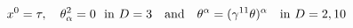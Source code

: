 \begin{equation}\label{5.2}
x^0=\tau,\quad \theta^2_\alpha=0~~{\rm in}~D=3\quad {\rm and}\quad
\theta^\alpha=(\gamma^{11}\theta)^\alpha ~~~{\rm in}~D=2,10
\end{equation}

